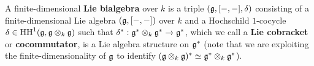         \begin{definition} \label{def: finite_dimensional_lie_bialgebras}
            A finite-dimensional \textbf{Lie bialgebra} over $k$ is a triple $(\mathfrak{g}, [-, -], \delta)$ consisting of a finite-dimensional Lie algebra $(\mathfrak{g}, [-, -])$ over $k$ and a Hochschild $1$-cocycle $\delta \in \HH^1(\g, \g \tensor_k \g)$ such that $\delta^*: \g^* \tensor_k \g^* \to \g^*$, which we call a \textbf{Lie cobracket} or \textbf{cocommutator}, is a Lie algebra structure on $\mathfrak{g}^*$ (note that we are exploiting the finite-dimensionality of $\mathfrak{g}$ to identify $(\g \tensor_k \g)^* \cong \g^* \tensor_k \g^*$). 
        \end{definition}
        \begin{remark}
            
        \end{remark}
    
